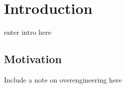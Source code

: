\chapter{Introduction}
enter intro here

\section{Motivation}
Include a note on overengineering here


